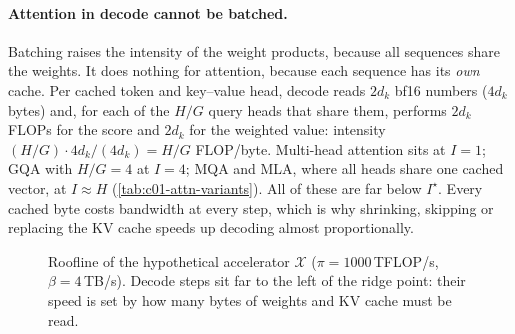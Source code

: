 \paragraph{Attention in decode cannot be batched.} Batching raises the intensity of the weight
products, because all sequences share the weights. It does nothing for attention, because
each sequence has its \emph{own} cache. Per cached token and key--value head, decode reads
$2d_k$ bf16 numbers ($4d_k$ bytes) and, for each of the $H/G$ query heads that share them,
performs $2d_k$ FLOPs for the score and $2d_k$ for the weighted value: intensity
$(H/G)\cdot 4d_k / (4d_k) = H/G$ FLOP/byte. Multi-head attention sits at $I = 1$; GQA with
$H/G = 4$ at $I = 4$; MQA and MLA, where all heads share one cached vector, at $I \approx H$
(\cref{tab:c01-attn-variants}). All of these are far below $I^\star$. Every cached byte
costs bandwidth at every step, which is why shrinking, skipping or replacing the KV cache
speeds up decoding almost proportionally.

\begin{figure}[t]
\centering
{}
\caption{Roofline of the hypothetical accelerator $\mathcal{X}$ ($\pi = 1000$\,TFLOP/s,
$\beta = 4$\,TB/s). Decode steps sit far to the left of the ridge point: their speed is set
by how many bytes of weights and KV cache must be read.}
\label{fig:c01-roofline}
\end{figure}


